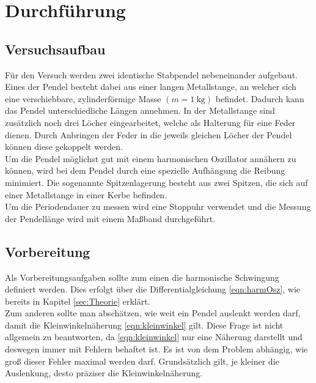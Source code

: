 \section{Durchführung}
\label{sec:Durchführung}
\subsection{Versuchsaufbau}
Für den Versuch werden zwei identische Stabpendel nebeneinander aufgebaut. Eines der Pendel besteht dabei aus einer langen Metallstange, an welcher sich eine
verschiebbare, zylinderförmige Masse $(m=\SI{1}{\kilo\gram})$ befindet. Dadurch kann das Pendel unterschiedliche Längen annehmen. In der Metallstange sind zusätzlich
noch drei Löcher eingearbeitet, welche als Halterung für eine Feder dienen. Durch Anbringen der Feder in die jeweils gleichen Löcher der Pendel können diese
gekoppelt werden.
\\
Um die Pendel möglichst gut mit einem harmonischen Oszillator annähern zu können, wird bei dem Pendel durch eine spezielle Aufhängung die Reibung minimiert. 
Die sogenannte Spitzenlagerung besteht aus zwei Spitzen, die sich auf einer Metallstange in einer Kerbe befinden. 
\\
Um die Periodendauer zu messen wird eine Stoppuhr verwendet und die Messung der Pendellänge wird mit einem Maßband durchgeführt.
\subsection{Vorbereitung}
Als Vorbereitungsaufgaben sollte zum einen die harmonische Schwingung definiert werden. Dies erfolgt über die Differentialgleichung
\eqref{eqn:harmOsz}, wie bereits in Kapitel \ref{sec:Theorie} erklärt. 
\\
Zum anderen sollte man abschätzen, wie weit ein Pendel auslenkt werden darf, damit die Kleinwinkelnäherung \eqref{eqn:kleinwinkel}
gilt. Diese Frage ist nicht allgemein zu beantworten, da \eqref{eqn:kleinwinkel} nur eine Näherung darstellt und deswegen immer 
mit Fehlern behaftet ist. Es ist von dem Problem abhängig, wie groß dieser Fehler maximal werden darf. Grundsätzlich gilt, je kleiner 
die Auslenkung, desto präziser die Kleinwinkelnäherung.

